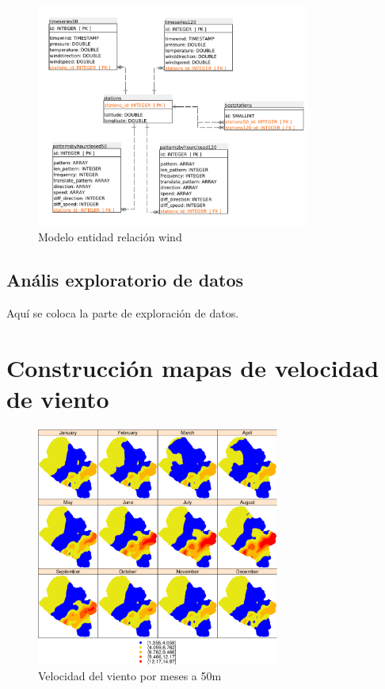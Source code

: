 \begin{figure}
  \centering
  \includegraphics[width = 9cm]{windET.pdf}
  \caption{Modelo entidad relación wind}
  \label{fig:windET}
\end{figure}


\subsection{Anális exploratorio de datos}

Aquí se coloca la parte de exploración de datos.


\section{Construcción mapas de velocidad de viento}



\begin{figure}
  \centering
  \includegraphics[width = 8cm]{meses.pdf}
  \caption{Velocidad del viento por meses a 50m}
  \label{fig:meses}
\end{figure}

